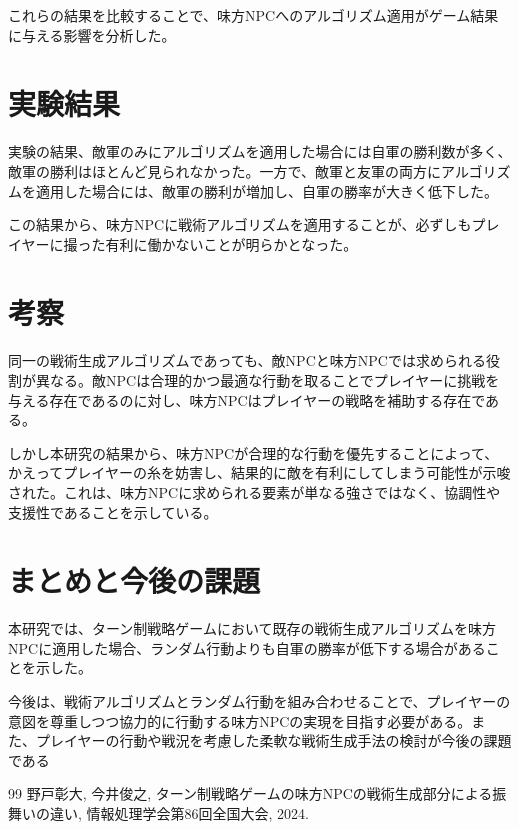 \documentclass[11pt]{jsarticle}
\begin{document}
これらの結果を比較することで、味方NPCへのアルゴリズム適用がゲーム結果に与える影響を分析した。

\section{実験結果}
実験の結果、敵軍のみにアルゴリズムを適用した場合には自軍の勝利数が多く、敵軍の勝利はほとんど見られなかった。一方で、敵軍と友軍の両方にアルゴリズムを適用した場合には、敵軍の勝利が増加し、自軍の勝率が大きく低下した。

この結果から、味方NPCに戦術アルゴリズムを適用することが、必ずしもプレイヤーに撮った有利に働かないことが明らかとなった。

\section{考察}
同一の戦術生成アルゴリズムであっても、敵NPCと味方NPCでは求められる役割が異なる。敵NPCは合理的かつ最適な行動を取ることでプレイヤーに挑戦を与える存在であるのに対し、味方NPCはプレイヤーの戦略を補助する存在である。

しかし本研究の結果から、味方NPCが合理的な行動を優先することによって、かえってプレイヤーの糸を妨害し、結果的に敵を有利にしてしまう可能性が示唆された。これは、味方NPCに求められる要素が単なる強さではなく、協調性や支援性であることを示している。

\section{まとめと今後の課題}
本研究では、ターン制戦略ゲームにおいて既存の戦術生成アルゴリズムを味方NPCに適用した場合、ランダム行動よりも自軍の勝率が低下する場合があることを示した。

今後は、戦術アルゴリズムとランダム行動を組み合わせることで、プレイヤーの意図を尊重しつつ協力的に行動する味方NPCの実現を目指す必要がある。また、プレイヤーの行動や戦況を考慮した柔軟な戦術生成手法の検討が今後の課題である

\begin{thebibliography}{99}
  野戸彰大, 今井俊之,
  ターン制戦略ゲームの味方NPCの戦術生成部分による振舞いの違い,
  情報処理学会第86回全国大会, 2024.
\end{thebibliography}
\end{document}
